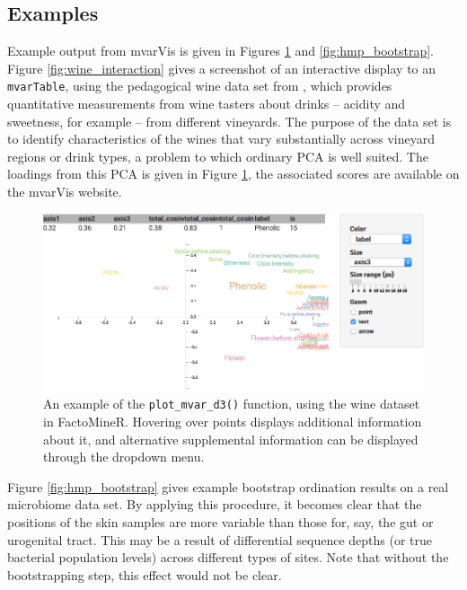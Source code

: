 \subsection{Examples}

Example output from mvarVis is given in Figures \ref{fig:wine_interactive} and
\ref{fig:hmp_bootstrap}. Figure \ref{fig:wine_interaction} gives a screenshot of
an interactive display to an \texttt{mvarTable}, using the pedagogical wine data
set from \cite{le2008factominer}, which provides quantitative measurements from
wine tasters about drinks -- acidity and sweetness, for example -- from
different vineyards. The purpose of the data set is to identify characteristics
of the wines that vary substantially across vineyard regions or drink types, a
problem to which ordinary PCA is well suited. The loadings from this PCA is
given in Figure \ref{fig:wine_interactive}, the associated scores are available
on the mvarVis website.

\begin{figure}[ht]
  \centering
  \includegraphics[width=\textwidth]{figure/treelapse/wine_interactive}
  \caption{ An example of the \texttt{plot\_mvar\_d3()} function, using the wine
    dataset in FactoMineR. Hovering over points displays additional information
    about it, and alternative supplemental information can be displayed through
    the dropdown menu.
    \label{fig:wine_interactive}
  }
\end{figure}

Figure \ref{fig:hmp_bootstrap} gives example bootstrap ordination results on a
real microbiome data set. By applying this procedure, it becomes clear that the
positions of the skin samples are more variable than those for, say, the gut or
urogenital tract. This may be a result of differential sequence depths (or true
bacterial population levels) across different types of sites. Note that without
the bootstrapping step, this effect would not be clear.

